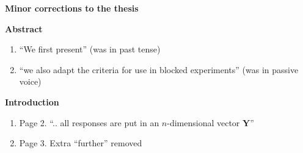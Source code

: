 \documentclass[11pt,a4paper,oneside]{article}
\begin{document}
\begin{center}
\textbf{\Large{Minor corrections to the thesis}}
\end{center}

\textbf{Abstract}
\begin{enumerate}
\item ``We first present'' (was in past tense)
\item ``we also adapt the criteria for use in blocked experiments'' (was in passive voice)
\end{enumerate}

\textbf{Introduction}
\begin{enumerate}
\item Page 2. ``.. all responses are put in an $n$-dimensional vector $\bm{Y}$''
\item Page 3. Extra ``further'' removed
\end{enumerate}
\end{document}
